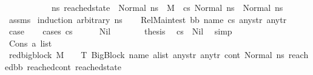 \begin{isabellebody}
\ \ \ \ \ \ \ \ \ \ \ {\isacharparenleft}{\kern0pt}{\isasymforall}ns{}{\isacharprime}{\kern0pt}{\isachardot}{\kern0pt}\ reached{\isacharunderscore}{\kern0pt}state\ {\isacharequal}{\kern0pt}\ Normal\ ns{}{\isacharprime}{\kern0pt}\ {\isasymlongrightarrow}\ {\isacharparenleft}{\kern0pt}M{\isacharcomma}{\kern0pt}{\isasymLambda}{\isacharcomma}{\kern0pt}{\isasymGamma}{\isacharcomma}{\kern0pt}{\isasymOmega}\ {\isasymturnstile}\ {\isasymlangle}cs{}{\isacharcomma}{\kern0pt}\ Normal\ ns{}{\isasymrangle}\ {\isacharbrackleft}{\kern0pt}{\isasymrightarrow}{\isacharbrackright}{\kern0pt}\ Normal\ ns{}{\isacharprime}{\kern0pt}{\isacharparenright}{\kern0pt}{\isacharparenright}{\kern0pt}{\isachardoublequoteclose}\ \isanewline
%
\isadelimproof
\ \ %
\endisadelimproof
%
\isatagproof
{}\isamarkupfalse%
\ assms\isanewline
{}\isamarkupfalse%
\ {\isacharparenleft}{\kern0pt}induction\ arbitrary{\isacharcolon}{\kern0pt}\ ns{}{\isacharparenright}{\kern0pt}\isanewline
\ \ \isamarkupfalse%
\ {\isacharparenleft}{\kern0pt}Rel{\isacharunderscore}{\kern0pt}Main{\isacharunderscore}{\kern0pt}test\ bb\ name\ cs{}\ any{\isacharunderscore}{\kern0pt}str\ any{\isacharunderscore}{\kern0pt}tr{\isacharparenright}{\kern0pt}\isanewline
\ \ \isamarkupfalse%
\ {\isacharquery}{\kern0pt}case\isanewline
\ \ \isamarkupfalse%
\ {\isacharparenleft}{\kern0pt}cases\ cs{}{\isacharparenright}{\kern0pt}\isanewline
\ \ \ \ \isamarkupfalse%
\ Nil\isanewline
\ \ \ \ \isamarkupfalse%
\ \isamarkupfalse%
\ {\isacharquery}{\kern0pt}thesis\ \isamarkupfalse%
\ {\isacartoucheopen}cs{}\ {\isasymnoteq}\ Nil{\isacartoucheclose}\ \isamarkupfalse%
\ simp\isanewline
\ \ \isamarkupfalse%
\isanewline
\ \ \ \ \isamarkupfalse%
\ {\isacharparenleft}{\kern0pt}Cons\ a\ list{\isacharparenright}{\kern0pt}\isanewline
\ \ \ \ \isamarkupfalse%
\ \isamarkupfalse%
\ {\isachardoublequoteopen}red{\isacharunderscore}{\kern0pt}bigblock\ M\ {\isasymLambda}\ {\isasymGamma}\ {\isasymOmega}\ T\ {\isacharparenleft}{\kern0pt}{\isacharparenleft}{\kern0pt}BigBlock\ name\ {\isacharparenleft}{\kern0pt}a{\isacharhash}{\kern0pt}list{\isacharparenright}{\kern0pt}\ any{\isacharunderscore}{\kern0pt}str\ any{\isacharunderscore}{\kern0pt}tr{\isacharparenright}{\kern0pt}{\isacharcomma}{\kern0pt}\ cont{}{\isacharcomma}{\kern0pt}\ {\isacharparenleft}{\kern0pt}Normal\ ns{}{\isacharparenright}{\kern0pt}{\isacharparenright}{\kern0pt}\ {\isacharparenleft}{\kern0pt}reached{\isacharunderscore}{\kern0pt}bb{\isacharcomma}{\kern0pt}\ reached{\isacharunderscore}{\kern0pt}cont{\isacharcomma}{\kern0pt}\ reached{\isacharunderscore}{\kern0pt}state{\isacharparenright}{\kern0pt}{\isachardoublequoteclose}\ \isanewline

\end{isabellebody}
